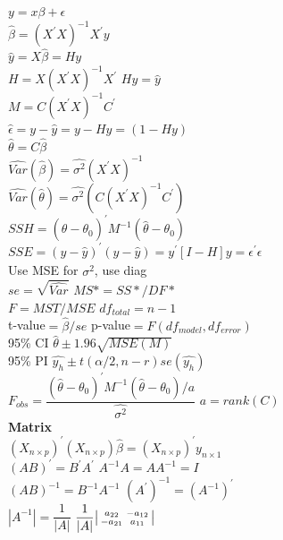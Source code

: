 \documentclass[10pt,landscape]{article}
\newenvironment{lsmallmatrix}
{\left|\begin{smallmatrix}}
	{\end{smallmatrix}\right|}
\newcommand{\B}{\beta}
\newcommand{\sg}{\sigma}
\newcommand{\hb}{\hat{\beta}}
\newcommand{\hth}{\hat{\theta}}
\begin{document}
\raggedright
\footnotesize
\begin{multicols*}{4}
\setlength{\premulticols}{1pt}
\setlength{\postmulticols}{1pt}
\setlength{\multicolsep}{1pt}
\setlength{\columnsep}{2pt}

\setlength{\columnseprule}{.25pt}
\setlength{\premulticols}{.25pt}
\setlength{\postmulticols}{.25pt}
\setlength{\multicolsep}{.25pt}
\setlength{\columnsep}{.25pt}
$y=x\B+\epsilon$\\
$\hb=(X^{'}X)^{-1}X^{'}y$\\
$\hat{y}=X\hb=Hy$\\
$H=X(X^{'}X)^{-1}X^{'}$ \quad $Hy=\hat{y}$\\
$M=C(X^{'}X)^{-1}C^{'}$\\
$\hat{\epsilon}=y-\hat{y}=y-Hy=(1-Hy)$\\
$\hth=C\hb$\\
$\hat{Var}(\hb)=\hat{\sg^2}(X^{'}X)^{-1}$ \\
$\hat{Var}(\hth)=\hat{\sg^2}(C(X^{'}X)^{-1}C^{'})$\\
$SSH=(\hth-\theta_0)^{'}M^{-1}(\hth-\theta_0)$\\
$SSE=(y-\hat{y})^{'}(y-\hat{y})=y^{'}[I-H]y=\epsilon^{\prime}\epsilon$\\
Use MSE for $\hat{\sg^2}$, use diag\\
$se=\sqrt{\hat{Var}}$\quad
$MS*=SS*/DF*$\\
$F=MST/MSE$\quad
$df_{total}=n-1$\\
t-value$=\hb/se$\quad
p-value$=F(df_{model},df_{error})$\\
95\% CI  $\hth\pm 1.96\sqrt{MSE(M)}$\\
95\% PI $\hat{y_h}\pm t(\alpha/2,n-r)se(\hat{y_h})$\\
$F_{obs}=\dfrac{(\hth-\theta_0)^{'}M^{-1}(\hth-\theta_0)/a}{\hat{\sg^2}}$ $a=rank(C)$\\
\textbf{Matrix}\\
$(X_{n\times p})^{'}(X_{n \times p})\hb=(X_{n\times p})^{'}y_{n\times 1}$ \\
$(AB)^{'}=B^{'}A^{'}$\quad
$A^{-1}A=AA^{-1}=I$\\
$(AB)^{-1}=B^{-1}A^{-1}$\quad
$(A^{'})^{-1}=(A^{-1})^{'}$\\
$|A^{-1}|=\dfrac{1}{|A|}$\quad
$\dfrac{1}{|A|}
\begin{lsmallmatrix}
a_{22}&-a_{12}\\
-a_{21}& a_{11}
\end{lsmallmatrix}$\\

\end{multicols*}
\end{document}
